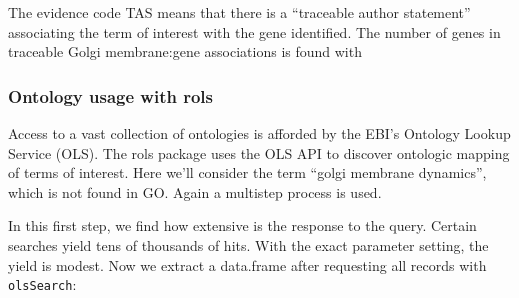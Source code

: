 The evidence code TAS means that there is a ``traceable author statement''
associating the term of interest with the gene identified. The
number of genes in traceable Golgi membrane:gene associations
is found with

\begin{Shaded}
\begin{Highlighting}[]
\OperatorTok{|}\ErrorTok{\textgreater{}}\StringTok{ }\OperatorTok{::}\OperatorTok{==}\NormalTok{) }\OperatorTok{|}\ErrorTok{\textgreater{}}\StringTok{ }\OperatorTok{|}\ErrorTok{\textgreater{}}\StringTok{ }\NormalTok{()}
\end{Highlighting}
\end{Shaded}

\hypertarget{ontology-usage-with-rols}{%
\subsubsection{Ontology usage with rols}\label{ontology-usage-with-rols}}

Access to a vast collection of ontologies is afforded by the EBI's
Ontology Lookup Service (OLS). The rols package uses the OLS API
to discover ontologic mapping of terms of interest. Here we'll
consider the term ``golgi membrane dynamics'', which is not found in GO.
Again a multistep process is used.

\begin{Shaded}
\begin{Highlighting}[]
\StringTok{ }\NormalTok{(}\NormalTok{, }\NormalTok{)}
\end{Highlighting}
\end{Shaded}

In this first step, we find how extensive is the response
to the query. Certain searches yield tens of thousands of hits.
With the exact parameter setting, the yield is modest.
Now we extract a data.frame after requesting all
records with \texttt{olsSearch}:

